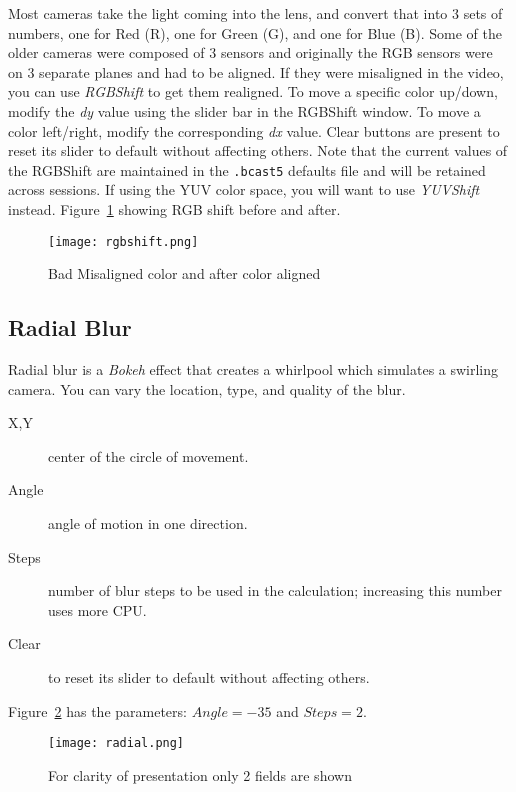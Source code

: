 Most cameras take the light coming into the lens, and convert that into $3$ sets of numbers, one for Red (R), one for Green (G), and one for Blue (B). Some of the older cameras were composed of $3$ sensors and originally the RGB sensors were on $3$ separate planes and had to be aligned. If they were misaligned in the video, you can use \textit{RGBShift} to get them realigned. To move a specific color up/down, modify the \textit{dy} value using the slider bar in the RGBShift window. To move a color left/right, modify the corresponding \textit{dx} value. Clear buttons are present to reset its slider to default without affecting others. Note that the current values of the RGBShift are maintained in the \texttt{.bcast5} defaults file and will be retained across sessions. If using the YUV color space, you will want to use \textit{YUVShift} instead. Figure~\ref{fig:rgbshift} showing RGB shift before and after.

\begin{figure}[hbtp]
    \centering
    \texttt{[image: rgbshift.png]}
    \caption{Bad Misaligned color and after color aligned}
    \label{fig:rgbshift}
\end{figure}

\subsection{Radial Blur}%
\label{sub:radial_blur}

Radial blur is a \textit{Bokeh} effect that creates a whirlpool which simulates a swirling camera. You can vary the location, type, and quality of the blur.

\begin{description}
    \item[X,Y] center of the circle of movement.
    \item[Angle] angle of motion in one direction.
    \item[Steps] number of blur steps to be used in the calculation; increasing this number uses more CPU.
    \item[Clear] to reset its slider to default without affecting others.
\end{description}

Figure~\ref{fig:radial} has the parameters: $Angle=-35$ and $Steps=2$.

\begin{figure}[hbtp]
    \centering
    \texttt{[image: radial.png]}
    \caption{For clarity of presentation only 2 fields are shown}
    \label{fig:radial}
\end{figure}

